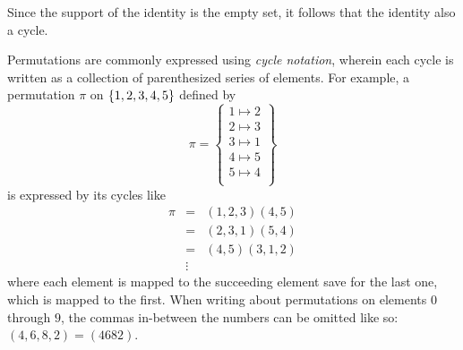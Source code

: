\documentclass[a4paper,twoside,12pt,openany]{report}
\theoremstyle{plain}
\theoremstyle{definition}
\newtheorem{definition}{Definition}
\theoremstyle{remark}
\begin{document}
Since the support of the identity is the empty set, it follows that the identity also a cycle.

Permutations are commonly expressed using \textit{cycle notation}, wherein each cycle is written as a collection of parenthesized series of elements. For example, a permutation \(\pi\) on \(\left\{ 1,2,3,4,5 \right\}\) defined by 
\[
	\pi = \left\{\begin{array}{cl}
		1 \mapsto 2 \\
		2 \mapsto 3 \\
		3 \mapsto 1 \\
		4 \mapsto 5 \\
		5 \mapsto 4 \\
	\end{array}\right\}
\]
is expressed by its cycles like
\[
\begin{array}{ccl}
    \pi &=& (1,2,3)(4,5) \\
	&= &(2,3,1)(5,4) \\
	&= &(4,5)(3,1,2) \\
	& \vdots
\end{array}
\]
where each element is mapped to the succeeding element save for the last one, which is mapped to the first. When writing about permutations on elements \(0\) through \(9\), the commas in-between the numbers can be omitted like so: \((4,6,8,2) = (4682)\).

%
%
%
\end{document}
